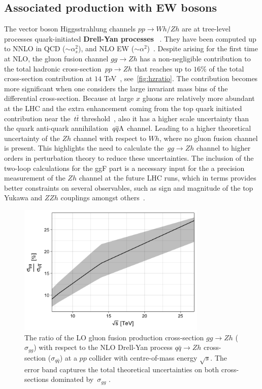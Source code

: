 \subsection{Associated production with EW bosons \label{vhproduction}}
\par The vector boson Higgsstrahlung channels $pp\to Wh/Zh$ are at tree-level processes quark-initiated  \textbf{Drell-Yan processes}~ \cite{Han:1991ia,Brein:2003wg}. They have been computed up to  NNLO in QCD ($\sim \alpha_s^2$), and  NLO EW  ($\sim \alpha^2 $)~\cite{Amoroso:2020lgh}.
 Despite arising for the first time at NLO, the gluon fusion channel $g g \rightarrow Zh$ has a non-negligible contribution to the total hadronic cross-section~$pp\to Zh$ that reaches up to $16\%$ of the total cross-section contribution at $14$ TeV~\cite{Cepeda:2019klc}, see~\autoref{fig:hzratio}. The contribution becomes more significant when one considers the  large invariant mass bins of the differential cross-section. Because at large $x$ gluons are relatively more abundant at the LHC and the extra enhancement coming from the top quark initiated contribution near the~$t\bar t$ threshold~\cite{Englert:2013vua}, also it has a higher scale uncertainty than the quark anti-quark annihilation~$q\overline q \rm A$ channel. Leading to a higher theoretical uncertainty of the $Zh$ channel with respect to $Wh$, where no gluon fusion channel is present. This highlights the need to calculate the~$g g \rightarrow Z h$ channel to higher orders in perturbation theory to reduce these uncertainties. The inclusion of the two-loop calculations for the ggF part is a necessary input for the a precision measurement of the $Zh$ channel at the future LHC runs, which in terms provides better constraints on several observables, such as sign and magnitude of the top Yukawa and $ZZh$ couplings amongst others~\cite{Englert:2016hvy}.
\begin{figure}
	\begin{center}
		\includegraphics[width=9cm]{./figures/Rplot}
		\caption{The ratio of the LO gluon fusion production cross-section $ gg \to Zh$  ($\sigma_{gg}$) with respect to the NLO Drell-Yan process $ q\bar{q} \to Zh$ cross-section ($\sigma_{q\bar{q}}$) at a $pp$ collider with centre-of-mass energy $\sqrt{s}$. The error band captures the total theoretical uncertainties on both cross-sections dominated by~$\sigma_{gg}$ .}
		\label{fig:hzratio}
	\end{center}
\end{figure}
